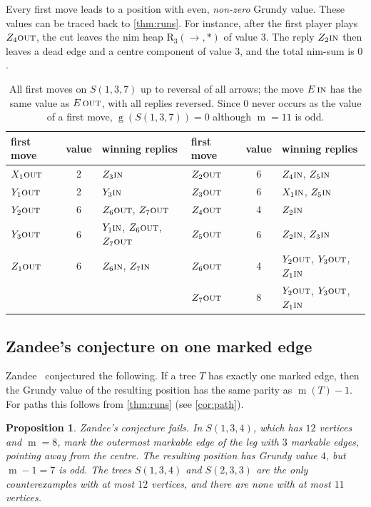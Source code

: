 \documentclass[11pt]{amsart}
\newtheorem{proposition}[theorem]{Proposition}
\theoremstyle{definition}
\theoremstyle{remark}
\newcommand{\gv}{\operatorname{g}}           %
\newcommand{\m}{\operatorname{m}}
\newcommand{\R}{\mathrm{R}}
\newcommand{\Sp}{S}
\newcommand{\free}{\ast}
\newcommand{\rgt}{\rightarrow}
\newcommand{\IN}{\textup{\textsc{in}}}
\newcommand{\OUT}{\textup{\textsc{out}}}
\begin{document}
Every first move leads to a position with even, \emph{non-zero} Grundy value. These values can be traced back to \cref{thm:runs}. For instance, after the first player plays $Z_4\OUT$, the cut leaves the nim heap $\R_3(\rgt,\free)$ of value $3$. The reply $Z_2\IN$ then leaves a dead edge and a centre component of value $3$, and the total nim-sum is $0$.

\begin{table}[t]
\centering
\small
\begin{tabular}{lcl@{\qquad}lcl}
\toprule
first move & value & winning replies & first move & value & winning replies\\
\midrule
$X_1\OUT$ & 2 & $Z_3\IN$ & $Z_2\OUT$ & 6 & $Z_4\IN$, $Z_5\IN$\\
$Y_1\OUT$ & 2 & $Y_3\IN$ & $Z_3\OUT$ & 6 & $X_1\IN$, $Z_5\IN$\\
$Y_2\OUT$ & 6 & $Z_6\OUT$, $Z_7\OUT$ & $Z_4\OUT$ & 4 & $Z_2\IN$\\
$Y_3\OUT$ & 6 & $Y_1\IN$, $Z_6\OUT$, $Z_7\OUT$ & $Z_5\OUT$ & 6 & $Z_2\IN$, $Z_3\IN$\\
$Z_1\OUT$ & 6 & $Z_6\IN$, $Z_7\IN$ & $Z_6\OUT$ & 4 & $Y_2\OUT$, $Y_3\OUT$, $Z_1\IN$\\
 & & & $Z_7\OUT$ & 8 & $Y_2\OUT$, $Y_3\OUT$, $Z_1\IN$\\
\bottomrule
\end{tabular}
\caption{All first moves on $\Sp(1,3,7)$ up to reversal of all arrows; the move $E\,\IN$ has the same value as $E\,\OUT$, with all replies reversed. Since $0$ never occurs as the value of a first move, $\gv(\Sp(1,3,7))=0$ although $\m=11$ is odd.}
\label{tab:firstmoves}
\end{table}

\subsection{Zandee's conjecture on one marked edge}
Zandee~\cite[Conjecture~4.3]{Zandee2022} conjectured the following. If a tree $T$ has exactly one marked edge, then the Grundy value of the resulting position has the same parity as $\m(T)-1$. For paths this follows from \cref{thm:runs} (see \cref{cor:path}).

\begin{proposition}\label{prop:zandee}
Zandee's conjecture fails. In $\Sp(1,3,4)$, which has $12$ vertices and $\m=8$, mark the outermost markable edge of the leg with $3$ markable edges, pointing away from the centre. The resulting position has Grundy value $4$, but $\m-1=7$ is odd. The trees $\Sp(1,3,4)$ and $\Sp(2,3,3)$ are the only counterexamples with at most $12$ vertices, and there are none with at most $11$ vertices.
\end{proposition}
\end{document}

